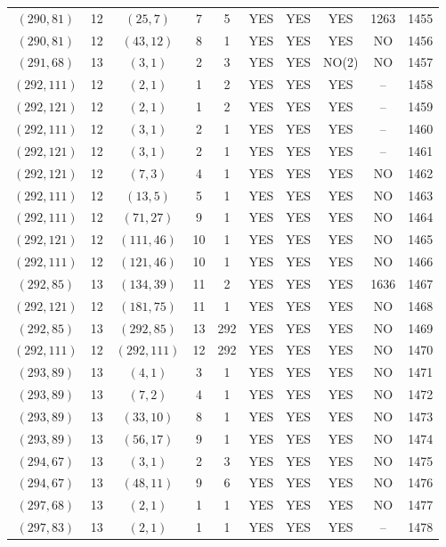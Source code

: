 \begin{longtable}{|c|c|c|c|c|c|c|c|c|c|}
$(290, 81)$ & 12 & $(25, 7)$ & 7 & 5 & YES & YES & YES & 1263 & 1455\\
$(290, 81)$ & 12 & $(43, 12)$ & 8 & 1 & YES & YES & YES & NO & 1456\\
$(291, 68)$ & 13 & $(3, 1)$ & 2 & 3 & YES & YES & NO(2) & NO & 1457\\
$(292, 111)$ & 12 & $(2, 1)$ & 1 & 2 & YES & YES & YES & -- & 1458\\
$(292, 121)$ & 12 & $(2, 1)$ & 1 & 2 & YES & YES & YES & -- & 1459\\
$(292, 111)$ & 12 & $(3, 1)$ & 2 & 1 & YES & YES & YES & -- & 1460\\
$(292, 121)$ & 12 & $(3, 1)$ & 2 & 1 & YES & YES & YES & -- & 1461\\
$(292, 121)$ & 12 & $(7, 3)$ & 4 & 1 & YES & YES & YES & NO & 1462\\
$(292, 111)$ & 12 & $(13, 5)$ & 5 & 1 & YES & YES & YES & NO & 1463\\
$(292, 111)$ & 12 & $(71, 27)$ & 9 & 1 & YES & YES & YES & NO & 1464\\
$(292, 121)$ & 12 & $(111, 46)$ & 10 & 1 & YES & YES & YES & NO & 1465\\
$(292, 111)$ & 12 & $(121, 46)$ & 10 & 1 & YES & YES & YES & NO & 1466\\
$(292, 85)$ & 13 & $(134, 39)$ & 11 & 2 & YES & YES & YES & 1636 & 1467\\
$(292, 121)$ & 12 & $(181, 75)$ & 11 & 1 & YES & YES & YES & NO & 1468\\
$(292, 85)$ & 13 & $(292, 85)$ & 13 & 292 & YES & YES & YES & NO & 1469\\
$(292, 111)$ & 12 & $(292, 111)$ & 12 & 292 & YES & YES & YES & NO & 1470\\
$(293, 89)$ & 13 & $(4, 1)$ & 3 & 1 & YES & YES & YES & NO & 1471\\
$(293, 89)$ & 13 & $(7, 2)$ & 4 & 1 & YES & YES & YES & NO & 1472\\
$(293, 89)$ & 13 & $(33, 10)$ & 8 & 1 & YES & YES & YES & NO & 1473\\
$(293, 89)$ & 13 & $(56, 17)$ & 9 & 1 & YES & YES & YES & NO & 1474\\
$(294, 67)$ & 13 & $(3, 1)$ & 2 & 3 & YES & YES & YES & NO & 1475\\
$(294, 67)$ & 13 & $(48, 11)$ & 9 & 6 & YES & YES & YES & NO & 1476\\
$(297, 68)$ & 13 & $(2, 1)$ & 1 & 1 & YES & YES & YES & NO & 1477\\
$(297, 83)$ & 13 & $(2, 1)$ & 1 & 1 & YES & YES & YES & -- & 1478\\

\end{longtable}
